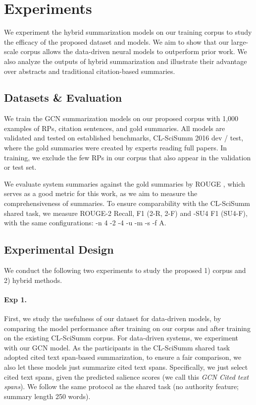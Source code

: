 \documentclass[letterpaper]{article} \usepackage{aaai19}  \usepackage{times}  \usepackage{helvet}  \usepackage{courier}  \usepackage{url}
\begin{document}
\section{Experiments}

We experiment
the hybrid summarization models on our training corpus to study the efficacy of the proposed dataset and models.
We aim to
show that our large-scale corpus allows the data-driven neural
models to outperform prior work.
We also analyze the outputs of hybrid summarization and illustrate their advantage over abstracts and traditional citation-based summaries.

\subsection{Datasets \& Evaluation}
We train the GCN summarization models on our proposed corpus with 1,000 examples of RPs, citation sentences, and gold summaries.
{All models are validated and tested on established benchmarks},
CL-SciSumm 2016 dev \!/\! test, where the gold summaries were created by experts reading full papers.
In training, we exclude the few RPs in our corpus that also appear in the validation or test set.


We evaluate system summaries against the gold summaries
by ROUGE \cite{lin2004rouge}, which serves as a good metric for this work, as we aim to measure the comprehensiveness of summaries.
To ensure comparability with the CL-SciSumm shared task, we measure ROUGE-2 Recall, F1 (2-R, 2-F) and -SU4 F1
(SU4-F), with the same configurations:
-n 4 -2 -4 -u -m -s -f A.






\subsection{Experimental Design}

\noindent We conduct the following two experiments to study the proposed 1) corpus and 2) hybrid methods.
\paragraph{Exp 1.}

First, we study the usefulness of our dataset for data-driven models, by comparing the model performance after training on our corpus and after training on the existing CL-SciSumm corpus.
For data-driven systems, we experiment with our GCN model.
As the participants in the CL-SciSumm shared task adopted cited text span-based summarization,
to ensure a fair comparison,
we also
let these models just summarize cited text spans.
Specifically, we just select cited text spans, given the predicted salience scores
(we call this {\it GCN Cited text spans}).
We follow the same protocol as the shared task (no authority feature; summary length 250 words).
\end{document}
